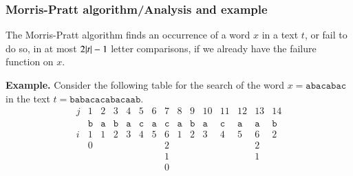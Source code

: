 %
\begin{frame}
\frametitle{Morris-Pratt algorithm/Analysis and example}

The Morris-Pratt algorithm finds an occurrence of a word \(x\) in a
text \(t\), or fail to do so, in at most \(2\lvert{t}\lvert{} - 1\) letter
comparisons, if we already have the failure function on \(x\).

\bigskip

\textbf{Example.} Consider the following table for the search of the
word \(x=\texttt{abacabac}\) in the text
\(t=\texttt{babacacabacaab}\).
\[
\begin{array}{c|cccccccccccccc|}
j & 1 & 2 & 3 & 4 & 5 & 6 & 7 & 8 & 9 & 10 & 11 & 12 & 13 & 14\\
  & \texttt{b} & \texttt{a} & \texttt{b} & \texttt{a} & \texttt{c}
  & \texttt{a} & \texttt{c} & \texttt{a} & \texttt{b} & \texttt{a}
  & \texttt{c} & \texttt{a} & \texttt{a} & \texttt{b}\\
\hline
i & 1 & 1 & 2 & 3 & 4 & 5 & 6 & 1 & 2 & 3 & 4 & 5 & 6 & 2 \\
  & 0 &   &   &   &   &   & 2 &   &   &   &   &   & 2 &   \\
  &   &   &   &   &   &   & 1 &   &   &   &   &   & 1 &   \\
  &   &   &   &   &   &   & 0 &   &   &   &   &   &   &
\end{array}
\]

\end{frame}

